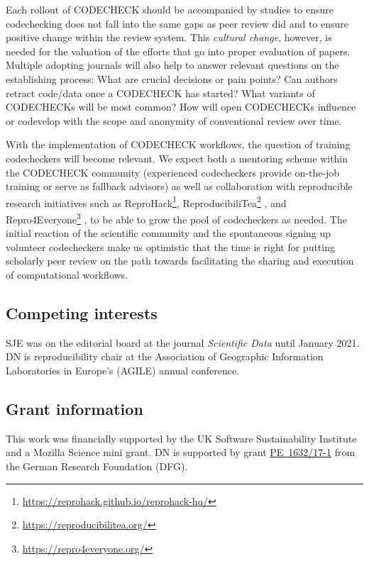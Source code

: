 \documentclass[12pt]{article}
\begin{document}
Each rollout of CODECHECK should be accompanied by studies to ensure 
codechecking does not fall into the same gaps as peer review did
\cite{tennant_limitations_2020}
and to ensure positive change within the review system.
This \emph{cultural change}, however, is needed for the valuation of the
efforts that go into proper evaluation of papers.
Multiple adopting journals will also help to answer relevant questions on
the establishing process: What are crucial decisions or pain points? Can
authors retract code/data once a CODECHECK has started?
What variants of CODECHECKs will be most common? How will open CODECHECKs
influence or codevelop with the scope and anonymity of conventional review over time.

With the implementation of CODECHECK workflows, the question of training
codecheckers will become relevant. We expect both a mentoring scheme within
the CODECHECK community (experienced codecheckers provide on-the-job training
or serve as fallback advisors) as well as collaboration with reproducible
research initiatives such as
ReproHack\footnote{\url{https://reprohack.github.io/reprohack-hq/}},
ReproducibiliTea\footnote{\url{https://reproducibilitea.org/}}
\cite{fitzgibbon_brewing_2020},
and Repro4Everyone\footnote{\url{https://repro4everyone.org/}}
\cite{auer_reproducibility_2020},
to be able to grow the pool of codecheckers as needed.
The initial reaction of the scientific community and the spontaneous signing
up volunteer codecheckers make us optimistic that the time is right for 
putting scholarly peer review on the path towards facilitating the sharing and execution
of computational workflows.

\newpage

\subsection*{Competing interests}

SJE was on the editorial board at the journal \emph{Scientific Data} until January 2021.
DN is reproducibility chair at the Association of Geographic Information Laboratories in Europe's (AGILE) annual conference.

\subsection*{Grant information}

This work was financially supported by the UK Software
Sustainability Institute and a Mozilla Science mini grant.
DN is supported by grant
\href{https://gepris.dfg.de/gepris/projekt/415851837}{PE~1632/17-1}
from the German Research Foundation (DFG).
\end{document}

